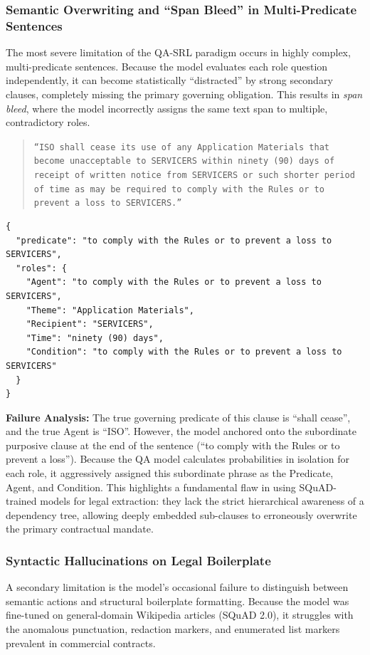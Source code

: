 \documentclass[twoside,final]{hcmut-report}
\begin{document}
\subsubsection*{Semantic Overwriting and ``Span Bleed'' in Multi-Predicate Sentences}

The most severe limitation of the QA-SRL paradigm occurs in highly complex, multi-predicate sentences. Because the model evaluates each role question independently, it can become statistically ``distracted'' by strong secondary clauses, completely missing the primary governing obligation. This results in \emph{span bleed}, where the model incorrectly assigns the same text span to multiple, contradictory roles.

\medskip

\begin{quote}
  \texttt{``ISO shall cease its use of any Application Materials that become unacceptable to SERVICERS within ninety (90) days of receipt of written notice from SERVICERS or such shorter period of time as may be required to comply with the Rules or to prevent a loss to SERVICERS.''}
\end{quote}

\begin{verbatim}
{
  "predicate": "to comply with the Rules or to prevent a loss to SERVICERS",
  "roles": {
    "Agent": "to comply with the Rules or to prevent a loss to SERVICERS",
    "Theme": "Application Materials",
    "Recipient": "SERVICERS",
    "Time": "ninety (90) days",
    "Condition": "to comply with the Rules or to prevent a loss to SERVICERS"
  }
}
\end{verbatim}

\noindent
\textbf{Failure Analysis:} The true governing predicate of this clause is ``shall cease'', and the true Agent is ``ISO''. However, the model anchored onto the subordinate purposive clause at the end of the sentence (``to comply with the Rules or to prevent a loss''). Because the QA model calculates probabilities in isolation for each role, it aggressively assigned this subordinate phrase as the Predicate, Agent, and Condition. This highlights a fundamental flaw in using SQuAD-trained models for legal extraction: they lack the strict hierarchical awareness of a dependency tree, allowing deeply embedded sub-clauses to erroneously overwrite the primary contractual mandate.

\medskip

\subsubsection*{Syntactic Hallucinations on Legal Boilerplate}
A secondary limitation is the model's occasional failure to distinguish between semantic actions and structural boilerplate formatting. Because the model was fine-tuned on general-domain Wikipedia articles (SQuAD 2.0), it struggles with the anomalous punctuation, redaction markers, and enumerated list markers prevalent in commercial contracts.
\end{document}
